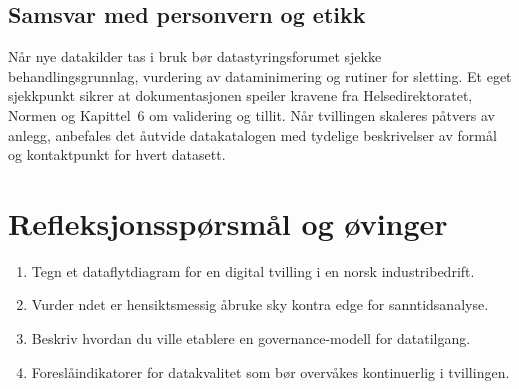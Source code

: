 \subsection{Samsvar med personvern og etikk}
N\aa r nye datakilder tas i bruk b\o r datastyringsforumet sjekke behandlingsgrunnlag, vurdering av dataminimering og rutiner for sletting. Et eget sjekkpunkt sikrer at dokumentasjonen speiler kravene fra Helsedirektoratet, Normen og Kapittel~6 om validering og tillit. N\aa r tvillingen skaleres p\aa tvers av anlegg, anbefales det \aa utvide datakatalogen med tydelige beskrivelser av form\aa l og kontaktpunkt for hvert datasett.

\section{Refleksjonssp\o rsm\aa l og \o vinger}
\begin{enumerate}
    \item Tegn et dataflytdiagram for en digital tvilling i en norsk industribedrift.
    \item Vurder n\aar det er hensiktsmessig \aa bruke sky kontra edge for sanntidsanalyse.
    \item Beskriv hvordan du ville etablere en governance-modell for datatilgang.
    \item Foresl\aa indikatorer for datakvalitet som b\o r overv\aa kes kontinuerlig i tvillingen.
\end{enumerate}
